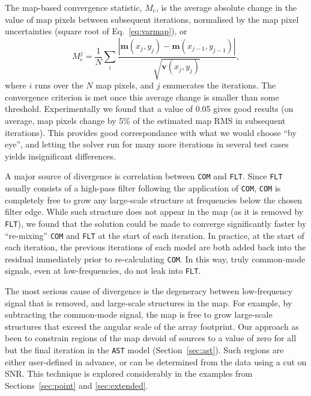 \documentclass[useAMS,usenatbib,nofootinbib]{mn2e}
\newcommand{\snr}{SNR}
\newcommand{\model}[1]{\texttt{#1}}
\begin{document}
The map-based convergence statistic, $M_\mathrm{c}$, is the average
absolute change in the value of map pixels between subsequent
iterations, normalised by the map pixel uncertainties (square root of
Eq.~\ref{eq:varmap}), or
%
\begin{equation}
M^j_\mathrm{c} = \frac{1}{N} \sum_i \frac{| \mathbf{m}(x_j,y_j) -
  \mathbf{m}(x_{j-1},y_{j-1}) |} {\sqrt{\mathbf{v}(x_j,y_j)}} ,
\end{equation}
%
where $i$ runs over the $N$ map pixels, and $j$ enumerates the
iterations. The convergence criterion is met once this average change
is smaller than some threshold. Experimentally we found that a value
of 0.05 gives good results (on average, map pixels change by 5\% of
the estimated map RMS in subsequent iterations).  This provides good
correspondance with what we would choose ``by eye'', and letting the
solver run for many more iterations in several test cases yields
insignificant differences.

A major source of divergence is correlation between \model{COM} and
\model{FLT}. Since \model{FLT} usually consists of a high-pass filter
following the application of \model{COM}, \model{COM} is completely
free to grow any large-scale structure at frequencies below the chosen
filter edge. While such structure does not appear in the map (as it is
removed by \model{FLT}), we found that the solution could be made to
converge significantly faster by ``re-mixing'' \model{COM} and
\model{FLT} at the start of each iteration. In practice, at the start
of each iteration, the previous iterations of each model are both
added back into the residual immediately prior to re-calculating
\model{COM}. In this way, truly common-mode signals, even at
low-frequencies, do not leak into \model{FLT}.

The most serious cause of divergence is the degeneracy between
low-frequency signal that is removed, and large-scale structures in
the map. For example, by subtracting the common-mode signal, the map
is free to grow large-scale structures that exceed the angular scale
of the array footprint. Our approach as been to constrain regions of
the map devoid of sources to a value of zero for all but the final
iteration in the \model{AST} model (Section~\ref{sec:ast}). Such
regions are either user-defined in advance, or can be determined from
the data using a cut on \snr. This technique is explored considerably
in the examples from Sections~\ref{sec:point} and \ref{sec:extended}.

\end{document}
